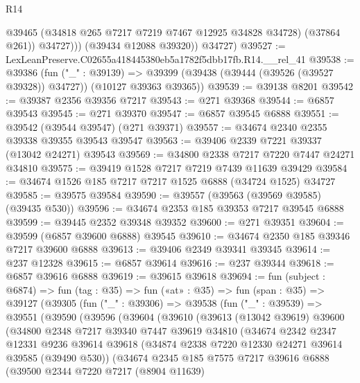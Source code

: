 \begin{lexlean}{R14}
\begin{coremodule}
                @39465
                (@34818 @265 @7217 @7219 @7467 @12925 @34828 @34728)
                (@37864 @261))
              @34727)))
        (@39434 @12088 @39320))
      @34727)
@39527 := LexLeanPreserve.C02655a418445380eb5a1782f5dbb17fb.R14.__rel_41
@39538 := @39386
    (fun ("_" : @39139) =>
    @39399 (@39438 (@39444 (@39526 (@39527 @39328)) @34727)) (@10127 @39363 @39365))
@39539 := @39138 @8201
@39542 := @39387 @2356 @39356 @7217
@39543 := @271 @39368
@39544 := @6857 @39543
@39545 := @271 @39370
@39547 := @6857 @39545 @6888
@39551 := @39542 (@39544 @39547) (@271 @39371)
@39557 := @34674 @2340 @2355 @39338 @39355 @39543 @39547
@39563 := @39406 @2339 @7221 @39337 (@13042 @24271) @39543
@39569 := @34800 @2338 @7217 @7220 @7447 @24271 @34810
@39575 := @39419 @1528 @7217 @7219 @7439 @11639 @39429
@39584 := @34674 @1526 @185 @7217 @7217 @1525 @6888 (@34724 @1525) @34727
@39585 := @39575 @39584
@39590 := @39557 (@39563 (@39569 @39585) (@39435 @530))
@39596 := @34674 @2353 @185 @39353 @7217 @39545 @6888
@39599 := @39445 @2352 @39348 @39352
@39600 := @271 @39351
@39604 := @39599 (@6857 @39600 @6888) @39545
@39610 := @34674 @2350 @185 @39346 @7217 @39600 @6888
@39613 := @39406 @2349 @39341 @39345
@39614 := @237 @12328
@39615 := @6857 @39614
@39616 := @237 @39344
@39618 := @6857 @39616 @6888
@39619 := @39615 @39618
@39694 := fun (subject : @6874) =>
  fun (tag : @35) =>
  fun («at» : @35) =>
  fun (span : @35) =>
  @39127
    (@39305
      (fun ("_" : @39306) =>
      @39538
        (fun ("_" : @39539) =>
        @39551
          (@39590
            (@39596
              (@39604
                (@39610
                  (@39613
                    (@13042 @39619)
                    @39600
                    (@34800
                      @2348
                      @7217
                      @39340
                      @7447
                      @39619
                      @34810
                      (@34674
                        @2342
                        @2347
                        @12331
                        @9236
                        @39614
                        @39618
                        (@34874 @2338 @7220 @12330 @24271 @39614 @39585 (@39490 @530))
                        (@34674
                          @2345
                          @185
                          @7575
                          @7217
                          @39616
                          @6888
                          (@39500
                            @2344
                            @7220
                            @7217
                            (@8904 @11639)

\end{coremodule}
\end{lexlean}
